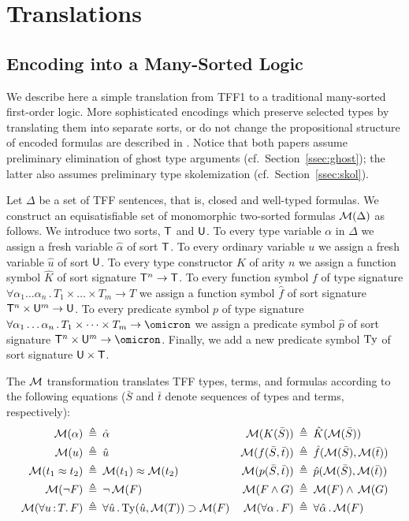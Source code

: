 \section{Translations} \label{sec:trans}

\subsection{Encoding into a Many-Sorted Logic} \label{ssec:tff0}

We describe here a simple translation from TFF1 to a traditional
many-sorted first-order logic. More sophisticated encodings which
preserve selected types by translating them into separate sorts,
or do not change the propositional structure of encoded formulas
are described in \cite{leino10tacas,bobot11frocos}.
Notice that both papers assume preliminary elimination
of ghost type arguments (cf.~Section~\ref{ssec:ghost});
the latter also assumes preliminary type skolemization
(cf.~Section~\ref{ssec:skol}).

Let $\Delta$ be a set of TFF sentences, that is, closed and well-typed
formulas. We construct an equisatisfiable set of monomorphic two-sorted
formulas $\mathcal{M}(\Delta)$ as follows.
%
We introduce two sorts, $\mathsf{T}$ and $\mathsf{U}$.
To every type variable $\alpha$ in $\Delta$ we assign
a fresh variable $\hat{\alpha}$ of sort $\mathsf{T}$.
To every ordinary variable $u$ we assign
a fresh variable $\hat{u}$ of sort $\mathsf{U}$.
To every type constructor $K$ of arity $n$ we assign
a function symbol $\hat{K}$ of sort signature $\mathsf{T}^n \to \mathsf{T}$.
To every function symbol $f$ of type signature
$\forall \alpha_1\dots\alpha_n \,.\, T_1 \times \dots \times T_m \to T$
we assign a function symbol $\hat{f}$ of sort signature
$\mathsf{T}^n \times \mathsf{U}^m \to \mathsf{U}$.
To every predicate symbol $p$ of type signature
$\forall \alpha_1\dots\alpha_n \,.\, T_1 \times \dots \times T_m \to \omicron$
we assign a predicate symbol $\hat{p}$ of sort signature
$\typ^n \times \und^m \to \omicron$.
Finally, we add a new predicate symbol $\mathrm{Ty}$ of sort signature
$\mathsf{U} \times \mathsf{T}$.

The $\mathcal{M}$ transformation translates TFF types, terms, and formulas
according to the following equations ($\bar{S}$ and $\bar{t}$ denote
sequences of types and terms, respectively):
\begin{align*}
\mathcal{M}(\alpha) &\:\triangleq\: \hat{\alpha} &
\mathcal{M}(K(\bar{S})) &\:\triangleq\: \hat{K}(\mathcal{M}(\bar{S})) \\
\mathcal{M}(u) &\:\triangleq\: \hat{u} &
\mathcal{M}(f(\bar{S},\bar{t})) &\:\triangleq\: \hat{f}(\mathcal{M}(\bar{S}),\mathcal{M}(\bar{t})) \\
\mathcal{M}(t_1 \approx t_2) &\:\triangleq\: \mathcal{M}(t_1) \approx \mathcal{M}(t_2) &
\mathcal{M}(p(\bar{S},\bar{t})) &\:\triangleq\: \hat{p}(\mathcal{M}(\bar{S}),\mathcal{M}(\bar{t})) \\
\mathcal{M}(\lnot F) &\:\triangleq\: \lnot\, \mathcal{M}(F) &
\mathcal{M}(F \land G) &\:\triangleq\: \mathcal{M}(F) \land\, \mathcal{M}(G) \\
\mathcal{M}(\forall u \operatorname{:} T .\, F) &\:\triangleq\:
\forall \hat{u} \,.\, \mathrm{Ty}(\hat{u}, \mathcal{M}(T)) \supset \mathcal{M}(F) &
\mathcal{M}(\forall \alpha \,.\, F) &\:\triangleq\:
\forall \hat{\alpha} \,.\, \mathcal{M}(F)
\end{align*}


